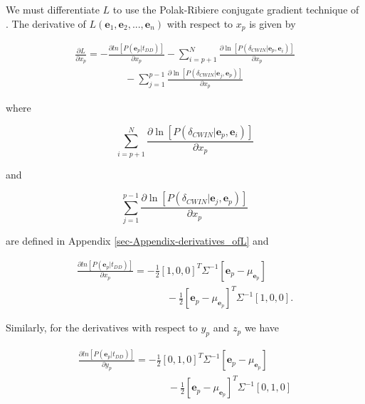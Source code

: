 \documentclass[12pt,double]{article}
\begin{document}
We must differentiate $L$ to use the Polak-Ribiere conjugate
gradient technique of \citet{dr_Press87a}. The derivative of
$L(\mathbf{e}_1, \mathbf{e}_2, ..., \mathbf{e}_n)$ with respect to
$x_p$ is given by
\begin{linenomath*} \begin{equation}
\begin{array}{l}
\frac{\partial L}{\partial x_p} =  - \frac{\partial ln\left[P(\mathbf{e}_p|t_{DD})\right]}{\partial x_p}
- \sum_{i=p+1}^{N} \frac{ \partial \ln
\left[P(\delta_{CWIN}|\mathbf{e}_p,\mathbf{e}_i)\right]}{\partial
x_p} \\
\hspace{5em} - \sum_{j=1}^{p-1} \frac{ \partial \ln
\left[P(\delta_{CWIN}|\mathbf{e}_j,\mathbf{e}_p)\right]}{\partial
x_p}
\end{array}
\end{equation} \end{linenomath*}
where
\begin{linenomath*} \begin{equation}
\sum_{i=p+1}^{N} \frac{ \partial \ln
\left[P(\delta_{CWIN}|\mathbf{e}_p,\mathbf{e}_i)\right]}{\partial
x_p}
\end{equation} \end{linenomath*}
and
\begin{linenomath*} \begin{equation}
\sum_{j=1}^{p-1} \frac{ \partial \ln
\left[P(\delta_{CWIN}|\mathbf{e}_j,\mathbf{e}_p)\right]}{\partial
x_p}
\end{equation} \end{linenomath*}
are defined in Appendix \ref{sec-Appendix-derivatives_ofL} and
\begin{linenomath*} \begin{equation}
\begin{array}{l}
\frac{\partial ln\left[P(\mathbf{e}_p|t_{DD})\right]}{\partial x_p}
= -\frac{1}{2}[1,0,0]^T \Sigma^{-1}
[\mathbf{e}_p-\mu_{\mathbf{e}_p}] \\
\hspace{9em} -\frac{1}{2}
[\mathbf{e}_p-\mu_{\mathbf{e}_p}]^T \Sigma^{-1} [1,0,0].
\end{array}
\end{equation} \end{linenomath*}
Similarly, for the derivatives with respect to $y_p$ and $z_p$ we
have
\begin{linenomath*} \begin{equation}
\begin{array}{l}
\frac{\partial ln\left[P(\mathbf{e}_p|t_{DD})\right]}{\partial y_p}
= -\frac{1}{2} [0,1,0]^T \Sigma^{-1}
[\mathbf{e}_p-\mu_{\mathbf{e}_p}] \\
\hspace{9em} -\frac{1}{2}
[\mathbf{e}_p-\mu_{\mathbf{e}_p}]^T \Sigma^{-1} [0,1,0]
\end{array}
\end{equation} \end{linenomath*}
\end{document}

